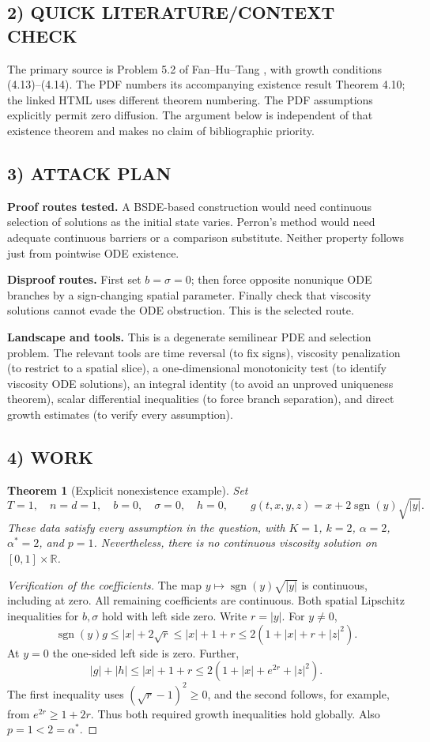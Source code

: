 \documentclass[11pt,a4paper]{article}
\newcommand{\R}{\mathbb R}
\newcommand{\sgn}{\operatorname{sgn}}
\newtheorem{theorem}{Theorem}
\theoremstyle{definition}
\begin{document}
\subsection*{2) QUICK LITERATURE/CONTEXT CHECK}
The primary source is Problem 5.2 of Fan--Hu--Tang \cite{FHT}, with growth conditions (4.13)--(4.14). The PDF numbers its accompanying existence result Theorem 4.10; the linked HTML uses different theorem numbering. The PDF assumptions explicitly permit zero diffusion. The argument below is independent of that existence theorem and makes no claim of bibliographic priority.

\subsection*{3) ATTACK PLAN}
\textbf{Proof routes tested.} A BSDE-based construction would need continuous selection of solutions as the initial state varies. Perron's method would need adequate continuous barriers or a comparison substitute. Neither property follows just from pointwise ODE existence.

\textbf{Disproof routes.} First set $b=\sigma=0$; then force opposite nonunique ODE branches by a sign-changing spatial parameter. Finally check that viscosity solutions cannot evade the ODE obstruction. This is the selected route.

\textbf{Landscape and tools.} This is a degenerate semilinear PDE and selection problem. The relevant tools are time reversal (to fix signs), viscosity penalization (to restrict to a spatial slice), a one-dimensional monotonicity test (to identify viscosity ODE solutions), an integral identity (to avoid an unproved uniqueness theorem), scalar differential inequalities (to force branch separation), and direct growth estimates (to verify every assumption).

\subsection*{4) WORK}
\begin{theorem}[Explicit nonexistence example]
Set
\[
 T=1,\quad n=d=1,\quad b=0,\quad\sigma=0,\quad h=0,
 \qquad g(t,x,y,z)=x+2\sgn(y)\sqrt{|y|}.
\]
These data satisfy every assumption in the question, with
$K=1$, $k=2$, $\alpha=2$, $\alpha^*=2$, and $p=1$.
Nevertheless, there is no continuous viscosity solution on $[0,1]\times\R$.
\end{theorem}
\begin{proof}[Verification of the coefficients]
The map $y\mapsto\sgn(y)\sqrt{|y|}$ is continuous, including at zero. All remaining coefficients are continuous. Both spatial Lipschitz inequalities for $b,\sigma$ hold with left side zero. Write $r=|y|$. For $y\ne0$,
\[
 \sgn(y)g\le |x|+2\sqrt r\le |x|+1+r
       \le2(1+|x|+r+|z|^2).
\]
At $y=0$ the one-sided left side is zero. Further,
\[
 |g|+|h|\le |x|+1+r
       \le2(1+|x|+e^{2r}+|z|^2).
\]
The first inequality uses $(\sqrt r-1)^2\ge0$, and the second follows, for example, from $e^{2r}\ge1+2r$. Thus both required growth inequalities hold globally. Also $p=1<2=\alpha^*$.
\end{proof}
\end{document}
